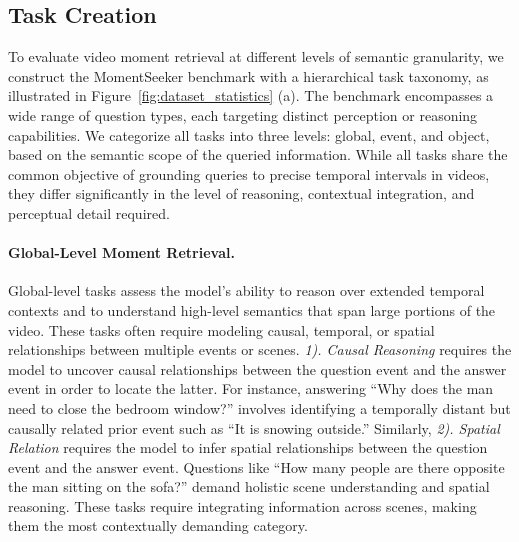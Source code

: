 \documentclass{article}
\begin{document}
\subsection{Task Creation}


To evaluate video moment retrieval at different levels of semantic granularity, we construct the MomentSeeker benchmark with a hierarchical task taxonomy, as illustrated in Figure~\ref{fig:dataset_statistics} (a). The benchmark encompasses a wide range of question types, each targeting distinct perception or reasoning capabilities. We categorize all tasks into three levels: global, event, and object, based on the semantic scope of the queried information. While all tasks share the common objective of grounding queries to precise temporal intervals in videos, they differ significantly in the level of reasoning, contextual integration, and perceptual detail required. 


\paragraph{Global-Level Moment Retrieval.}
Global-level tasks assess the model's ability to reason over extended temporal contexts and to understand high-level semantics that span large portions of the video. These tasks often require modeling causal, temporal, or spatial relationships between multiple events or scenes.
\textit{1). Causal Reasoning} requires the model to uncover causal relationships between the question event and the answer event in order to locate the latter. For instance, answering ``Why does the man need to close the bedroom window?'' involves identifying a temporally distant but causally related prior event such as ``It is snowing outside.''
Similarly, \textit{2). Spatial Relation} requires the model to infer spatial relationships between the question event and the answer event. Questions like ``How many people are there opposite the man sitting on the sofa?'' demand holistic scene understanding and spatial reasoning. These tasks require integrating information across scenes, making them the most contextually demanding category.
\end{document}
